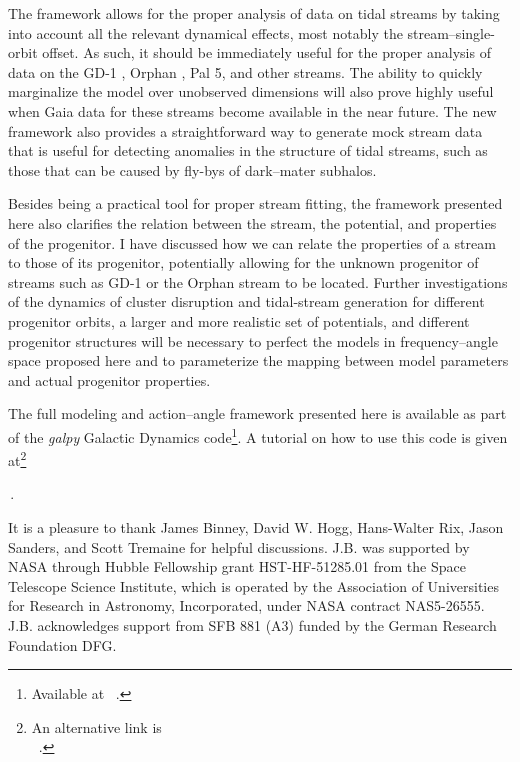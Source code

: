 \documentclass{emulateapj}
\newcommand{\eg}{e.g.}
\begin{document}
The framework allows for the proper analysis of data on tidal streams
by taking into account all the relevant dynamical effects, most
notably the stream--single-orbit offset. As such, it should be
immediately useful for the proper analysis of data on the GD-1
\citep{Koposov10a}, Orphan \citep[\eg,][]{Sesar13a}, Pal 5, and other
streams. The ability to quickly marginalize the model over unobserved
dimensions will also prove highly useful when Gaia data for these
streams become available in the near future. The new framework also
provides a straightforward way to generate mock stream data that is
useful for detecting anomalies in the structure of tidal streams, such
as those that can be caused by fly-bys of dark--mater subhalos.

Besides being a practical tool for proper stream fitting, the
framework presented here also clarifies the relation between the
stream, the potential, and properties of the progenitor. I have
discussed how we can relate the properties of a stream to those of its
progenitor, potentially allowing for the unknown progenitor of streams
such as GD-1 or the Orphan stream to be located. Further
investigations of the dynamics of cluster disruption and tidal-stream
generation for different progenitor orbits, a larger and more
realistic set of potentials, and different progenitor structures will
be necessary to perfect the models in frequency--angle space proposed
here and to parameterize the mapping between model parameters and
actual progenitor properties.

The full modeling and action--angle framework presented here is
available as part of the \emph{galpy} Galactic Dynamics
code\footnote{Available at
  ~.}. A tutorial on how
to use this code is given at\footnote{An alternative link is\\ ~.}
\begin{center}
\,.
\end{center}


\acknowledgements It is a pleasure to thank James Binney, David
W. Hogg, Hans-Walter Rix, Jason Sanders, and Scott Tremaine for
helpful discussions. J.B. was supported by NASA through Hubble
Fellowship grant HST-HF-51285.01 from the Space Telescope Science
Institute, which is operated by the Association of Universities for
Research in Astronomy, Incorporated, under NASA contract
NAS5-26555. J.B.  acknowledges support from SFB 881 (A3) funded by the
German Research Foundation DFG.
\end{document}
